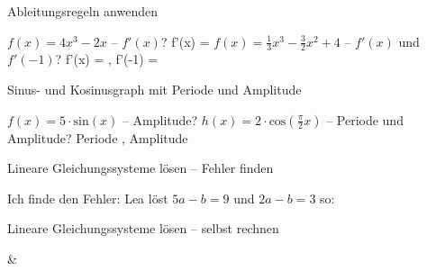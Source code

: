 \begin{aufgabe}{Ableitungsregeln anwenden}
\begin{teile}
\teil $f(x) = 4x^3 - 2x$ – $f'(x)$? f'(x) = \leerfeld
\teil $f(x) = \frac{1}{3}x^3 - \frac{3}{2}x^2 + 4$ – $f'(x)$ und $f'(-1)$? f'(x) = \leerfeld , f'(-1) = \leerfeld
\end{teile}
\end{aufgabe}

\begin{aufgabe}{Sinus- und Kosinusgraph mit Periode und Amplitude}
\begin{teile}
\teil $f(x) = 5 \cdot \mathrm{sin}(x)$ – Amplitude? \leerfeld
\teil $h(x) = 2 \cdot \mathrm{cos}\left(\frac{\pi}{2}x\right)$ – Periode und Amplitude? Periode \leerfeld , Amplitude \leerfeld
\end{teile}
\end{aufgabe}

\begin{aufgabe}{Lineare Gleichungssysteme lösen – Fehler finden}
\begin{teile}
\teil Ich finde den Fehler: Lea löst $5a - b = 9$ und $2a - b = 3$ so: 
\end{teile}
\end{aufgabe}

\begin{aufgabe}{Lineare Gleichungssysteme lösen – selbst rechnen}
\begin{gleichungsraster}[2]
 & \\
\end{gleichungsraster}
\end{aufgabe}

